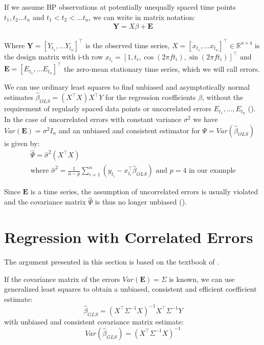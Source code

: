 If we assume BP observations at potentially unequally spaced
time points $t_1, t_2 \dots t_n$ and $t_1 < t_2 < \dots t_n$, we can write in matrix notation:
\begin{gather*}
\mathbf{Y} = X \beta + \mathbf{E}
\end{gather*}

Where $\mathbf{Y} = [Y_{t_1}, \dots Y_{t_n}]^{\top}$ is the observed time series,
$X = [x_{t_1}, \dots x_{t_n}]^{\top} \in \mathbb{R}^{n \times 4}$ is the design matrix with i-th row
$x_{t_i} = [1, t_i, \cos(2 \pi f t_i), \sin(2 \pi f t_i)]^{\top}$
and $\mathbf{E} = [E_{t_1}, \dots E_{t_n}]^{\top}$ the zero-mean stationary time series,
which we will call errors.

We can use ordinary least squares to find unbiased and asymptotically normal estimates $\hat{\beta}_{OLS} = (X^{\top}X) X^{\top}Y$
for the regression coefficients $\beta$, without the requirement of regularly spaced data points or uncorrelated errors
$E_{t_1}, \dots, E_{t_n}$ (\citeauthor{white_asymptotic_2001}).
In the case of uncorrelated errors with constant variance $\sigma^2$ we have
$Var(\mathbf{E}) = \sigma^2 I_n$ and an unbiased and consistent estimator for $\Psi = Var(\hat{\beta}_{OLS})$ is given by:
\begin{gather*}
\hat{\Psi} = \hat{\sigma}^2(X^{\top}X) \\
    \text{where $\hat{\sigma}^2=\frac{1}{n-p} \sum_{i = 1}^{n} (y_{t_i} - x_{t_i}^{\top} \hat{\beta}_{OLS})$ and $p=4$ in our example}
\end{gather*}

Since $\mathbf{E}$ is a time series, the assumption of uncorrelated errors is usually violated and the
covariance matrix $\hat{\Psi}$ is thus no longer unbiased (\citeauthor{brockwell_introduction_2016}).

\section{Regression with Correlated Errors}

The argument presented in this section is based on the textbook of \citeauthor{brockwell_introduction_2016}.

If the covariance matrix of the errors $Var(\mathbf{E}) = \Sigma$ is known,
we can use generalized least squares to obtain a unbiased, consistent and efficient coefficient estimate:
\[\hat{\beta}_{GLS} = (X^{\top} \Sigma^{-1} X)^{-1} X^{\top} \Sigma^{-1} Y\]
with unbiased and consistent covariance matrix estimate:
\[Var(\hat{\beta}_{GLS}) = (X^{\top} \Sigma^{-1} X)^{-1}\]

